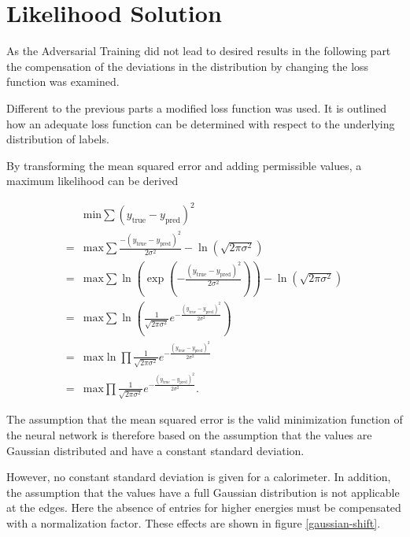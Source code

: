 \documentclass[12pt, a4paper]{thesis}
\begin{document}
\section{Likelihood Solution}
\label{sec:org05c2ceb}

As the Adversarial Training did not lead to desired results in the
following part the compensation of the deviations in the distribution
by changing the loss function was examined.

Different to the previous parts a modified loss function was used. It
is outlined how an adequate loss function can be determined with
respect to the underlying distribution of labels.

By transforming the mean squared error and adding permissible values,
a maximum likelihood can be derived

\begin{align}
    &\text{min} \sum (y_{\text{true}}-y_{\text{pred}})^2
  \\ =&\text{max} \sum\frac{-(y_{\text{true}}-y_{\text{pred}})^2}{2
    \sigma^2} - \ln(\sqrt{2\pi \sigma^2}) \\ = &\text{max} \sum
  \ln(\exp(-\frac{(y_{\text{true}}-y_{\text{pred}})^2}{2 \sigma^2})) -
  \ln(\sqrt{2\pi \sigma^2}) \\ = &\text{max} \sum \ln(
  \frac{1}{\sqrt{2\pi \sigma^2}}
  e^{-\frac{(y_{\text{true}}-y_{\text{pred}})^2}{2 \sigma^2}}) \\ =
  &\text{max} \ln \prod \frac{1}{\sqrt{2\pi \sigma^2}}
  e^{-\frac{(y_{\text{true}}-y_{\text{pred}})^2}{2 \sigma^2}}\\ =
  &\text{max} \prod \frac{1}{\sqrt{2\pi \sigma^2}}
  e^{-\frac{(y_{\text{true}}-y_{\text{pred}})^2}{2 \sigma^2}}.
\end{align}

The assumption that the mean squared error is the valid minimization
function of the neural network is therefore based on the assumption
that the values are Gaussian distributed and have a constant standard
deviation.

However, no constant standard deviation is given for a calorimeter. In
addition, the assumption that the values have a full Gaussian
distribution is not applicable at the edges. Here the absence of
entries for higher energies must be compensated with a normalization
factor. These effects are shown in figure \ref{gaussian-shift}.
\end{document}
